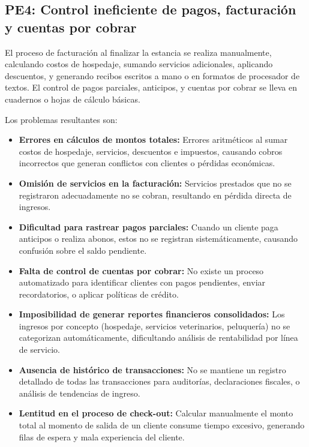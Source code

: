 \subsection{PE4: Control ineficiente de pagos, facturación y cuentas por cobrar}
\label{sec:pe4}

	El proceso de facturación al finalizar la estancia se realiza manualmente, calculando costos de hospedaje, sumando servicios adicionales, aplicando descuentos, y generando recibos escritos a mano o en formatos de procesador de textos. El control de pagos parciales, anticipos, y cuentas por cobrar se lleva en cuadernos o hojas de cálculo básicas.
	
	Los problemas resultantes son:
	
	\begin{itemize}
		\item \textbf{Errores en cálculos de montos totales:} Errores aritméticos al sumar costos de hospedaje, servicios, descuentos e impuestos, causando cobros incorrectos que generan conflictos con clientes o pérdidas económicas.
		
		\item \textbf{Omisión de servicios en la facturación:} Servicios prestados que no se registraron adecuadamente no se cobran, resultando en pérdida directa de ingresos.
		
		\item \textbf{Dificultad para rastrear pagos parciales:} Cuando un cliente paga anticipos o realiza abonos, estos no se registran sistemáticamente, causando confusión sobre el saldo pendiente.
		
		\item \textbf{Falta de control de cuentas por cobrar:} No existe un proceso automatizado para identificar clientes con pagos pendientes, enviar recordatorios, o aplicar políticas de crédito.
		
		\item \textbf{Imposibilidad de generar reportes financieros consolidados:} Los ingresos por concepto (hospedaje, servicios veterinarios, peluquería) no se categorizan automáticamente, dificultando análisis de rentabilidad por línea de servicio.
		
		\item \textbf{Ausencia de histórico de transacciones:} No se mantiene un registro detallado de todas las transacciones para auditorías, declaraciones fiscales, o análisis de tendencias de ingreso.
		
		\item \textbf{Lentitud en el proceso de check-out:} Calcular manualmente el monto total al momento de salida de un cliente consume tiempo excesivo, generando filas de espera y mala experiencia del cliente.
	\end{itemize}

